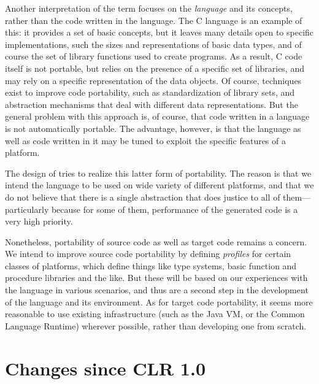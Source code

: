 Another interpretation of the term focuses on the {\em language} and
its concepts, rather than the code written in the language. The C
language is an example of this: it provides a set of basic concepts,
but it leaves many details open to specific implementations, such the
sizes and representations of basic data types, and of course the set
of library functions used to create programs. As a result, C code
itself is not portable, but relies on the presence of a specific set
of libraries, and may rely on a specific representation of the data
objects. Of course, techniques exist to improve code portability, such
as standardization of library sets, and abstraction mechanisms that
deal with different data representations. But the general problem with
this approach is, of course, that code written in a language is not
automatically portable. The advantage, however, is that the language
as well as code written in it may be tuned to exploit the specific
features of a platform.

The design of \Cal tries to realize this latter form
of portability. The reason is
that we intend the language to be used on wide variety of different
platforms, and that we do not believe that there is a single
abstraction that does justice to all of them---particularly because
for some of them, performance of the generated code is a very high
priority.

Nonetheless, portability of source code as well as target code remains
a concern. We intend to improve source code
portability by
defining {\em profiles} for certain classes of platforms, which define
things like type systems, basic function and procedure libraries and
the like. But these will be based on our experiences with the language
in various scenarios, and thus are a second step in the development of
the language and its environment. As for target code portability, it seems more reasonable
to use existing infrastructure (such as the Java VM, or the Common
Language Runtime) wherever possible, rather than developing one from
scratch.  


\section{Changes since CLR 1.0}


